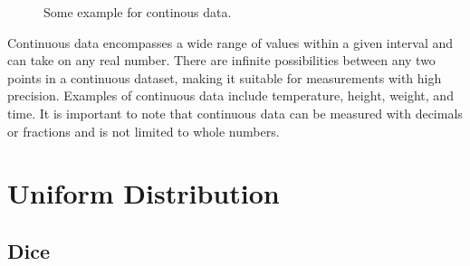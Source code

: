 \documentclass[
  a4paper,
]{scrbook}
\begin{document}
\begin{figure}[ht]


\caption{\label{fig-continousdata}Some example for continous data.}

\end{figure}%

Continuous data encompasses a wide range of values within a given
interval and can take on any real number. There are infinite
possibilities between any two points in a continuous dataset, making it
suitable for measurements with high precision. Examples of continuous
data include temperature, height, weight, and time. It is important to
note that continuous data can be measured with decimals or fractions and
is not limited to whole numbers.

\section{Uniform Distribution}\label{uniform-distribution}

\subsection{Dice}\label{dice}
\end{document}
